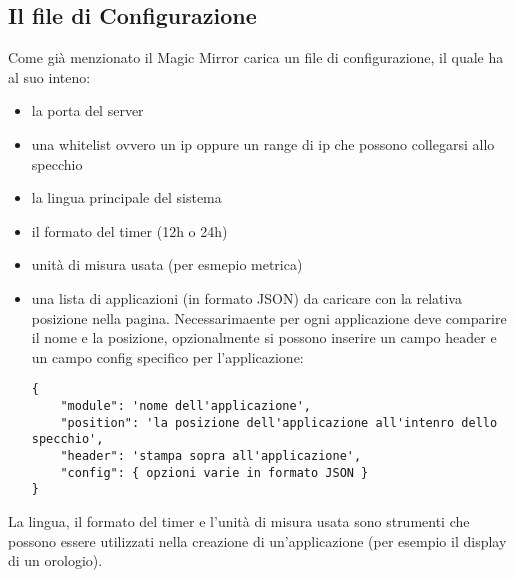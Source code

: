 \subsection{Il file di Configurazione}
Come gi\`a menzionato il Magic Mirror carica un file di configurazione, il quale ha al suo inteno:
\begin{itemize}
\item la porta del server
\item una whitelist ovvero un ip oppure un range di ip che possono collegarsi allo specchio
\item la lingua principale del sistema
\item il formato del timer (12h o 24h)
\item unit\`a di misura usata (per esmepio metrica)
\item una lista di applicazioni (in formato JSON) da caricare con la relativa posizione nella pagina. Necessarimaente per ogni applicazione deve comparire il
nome e la posizione, opzionalmente si possono inserire un campo header e un campo config specifico per l'applicazione:
\begin{lstlisting}
{
	"module": 'nome dell'applicazione',
	"position": 'la posizione dell'applicazione all'intenro dello specchio',
	"header": 'stampa sopra all'applicazione',
	"config": { opzioni varie in formato JSON }
}
\end{lstlisting}
\end{itemize}
La lingua, il formato del timer e l'unit\`a di misura usata sono strumenti che possono essere utilizzati nella creazione di un'applicazione
(per esempio il display di un orologio).

